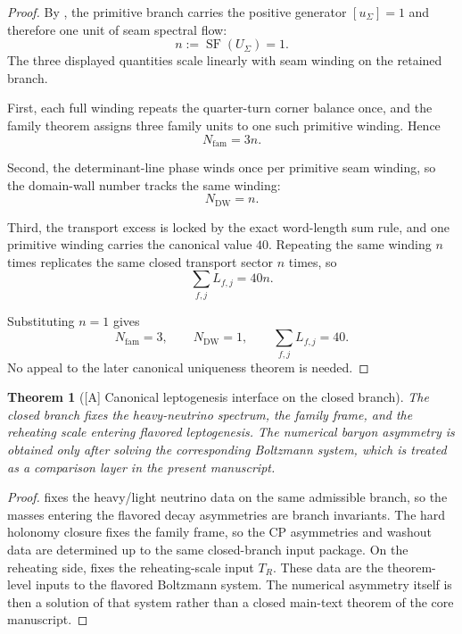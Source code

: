 \documentclass[11pt,a4paper]{article}
\newtheorem{theorem}{Theorem}[section]
\theoremstyle{definition}
\theoremstyle{remark}
\DeclareMathOperator{\SF}{SF}
\begin{document}
\begin{proof}
By , the primitive branch carries the positive generator
$[u_\Sigma]=1$ and therefore one unit of seam spectral flow:
\[
n:=\SF(U_\Sigma)=1.
\]
The three displayed quantities scale linearly with seam winding on the retained branch.

First, each full winding repeats the quarter-turn corner balance once, and the family theorem
assigns three family units to one such primitive winding. Hence
\[
N_{\mathrm{fam}}=3n.
\]

Second, the determinant-line phase winds once per primitive seam winding, so the domain-wall number
tracks the same winding:
\[
N_{\mathrm{DW}}=n.
\]

Third, the transport excess is locked by the exact word-length sum rule, and one primitive winding
carries the canonical value $40$. Repeating the same winding $n$ times replicates the same closed
transport sector $n$ times, so
\[
\sum_{f,j}L_{f,j}=40n.
\]

Substituting $n=1$ gives
\[
N_{\mathrm{fam}}=3,
\qquad
N_{\mathrm{DW}}=1,
\qquad
\sum_{f,j}L_{f,j}=40.
\]
No appeal to the later canonical uniqueness theorem is needed.
\end{proof}

\begin{theorem}[\textnormal{[A]} Canonical leptogenesis interface on the closed branch]
\label{thm:leptogenesis-closure}
The closed branch fixes the heavy-neutrino spectrum, the family frame, and the reheating scale
entering flavored leptogenesis. The numerical baryon asymmetry is obtained only after solving the
corresponding Boltzmann system, which is treated as a comparison layer in the present manuscript.
\end{theorem}

\begin{proof}
 fixes the heavy/light neutrino data on the same admissible branch, so
the masses entering the flavored decay asymmetries are branch invariants. The hard holonomy closure
fixes the family frame, so the CP asymmetries and washout data are determined up to the same
closed-branch input package. On the reheating side,  fixes the
reheating-scale input $T_R$. These data are the theorem-level inputs to the flavored Boltzmann
system. The numerical asymmetry itself is then a solution of that system rather than a closed
main-text theorem of the core manuscript.
\end{proof}
\end{document}
